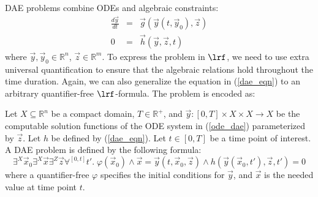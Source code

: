 \documentclass[11pt]{article}
\begin{document}
 DAE problems combine ODEs and algebraic constraints:
\begin{eqnarray}
\frac{d \vec y}{dt} &=& \vec g(\vec y(t, \vec y_0), \vec z)\label{ode_dae}\\
0 &=& \vec h(\vec y, \vec z, t)\label{dae_eqn}
\end{eqnarray}
where $\vec y, \vec y_0\in \mathbb{R}^n$, $\vec z\in \mathbb{R}^m$. To express the problem in $\lrf$, we need to use extra universal quantification to ensure that the algebraic relations hold throughout the time duration. Again, we can also generalize the equation in (\ref{dae_eqn}) to an arbitrary quantifier-free $\lrf$-formula. The problem is encoded as:
\begin{definition}
Let $X\subseteq \mathbb{R}^n$ be a compact domain, $T\in \mathbb{R}^+$, and $\vec y: [0,T]\times X\times X\rightarrow X$ be the computable solution functions of the ODE system in (\ref{ode_dae}) parameterized by $\vec z$. Let $h$ be defined by (\ref{dae_eqn}). Let $t\in [0,T]$ be a time point of interest. A DAE problem is defined by the following formula:
$$
\exists^X \vec x_0 \exists^X \vec x \exists^Z \vec z \forall^{[0,t]} t'.\;
\varphi(\vec x_0)\wedge \vec x = \vec y (t, \vec x_0, \vec z) \wedge h(\vec y(\vec x_0, t'), \vec z, t')=0
$$
where a quantifier-free $\varphi$ specifies the initial conditions for $\vec y$, and $\vec x$ is the needed value at time point $t$. 
\end{definition}
\end{document}
